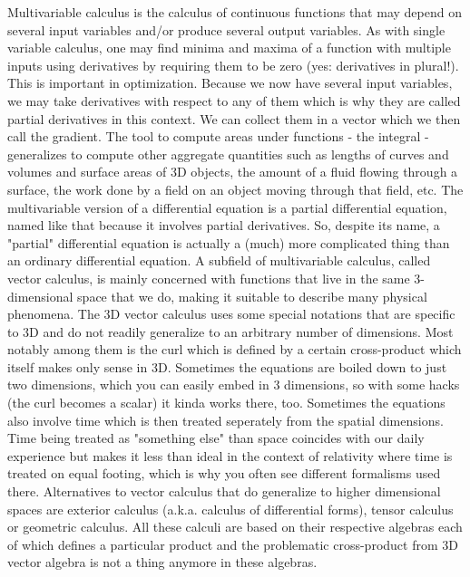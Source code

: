 \documentclass[12pt]{article}  %
\begin{document}
Multivariable calculus is the calculus of continuous functions that may depend on several input variables and/or produce several output variables. As with single variable calculus, one may find minima and maxima of a function with multiple inputs using derivatives by requiring them to be zero (yes: derivatives in plural!). This is important in optimization. Because we now have several input variables, we may take derivatives with respect to any of them which is why they are called partial derivatives in this context. We can collect them in a vector which we then call the gradient. The tool to compute areas under functions - the integral - generalizes to compute other aggregate quantities such as lengths of curves and volumes and surface areas of 3D objects, the amount of a fluid flowing through a surface, the work done by a field on an object moving through that field, etc. The multivariable version of a differential equation is a partial differential equation, named like that because it involves partial derivatives. So, despite its name, a "partial" differential equation is actually a (much) more complicated thing than an ordinary differential equation. A subfield of multivariable calculus, called vector calculus, is mainly concerned with functions that live in the same 3-dimensional space that we do, making it suitable to describe many physical phenomena. The 3D vector calculus uses some special notations that are specific to 3D and do not readily generalize to an arbitrary number of dimensions. Most notably among them is the curl which is defined by a certain cross-product which itself makes only sense in 3D. Sometimes the equations are boiled down to just two dimensions, which you can easily embed in 3 dimensions, so with some hacks (the curl becomes a scalar) it kinda works there, too. Sometimes the equations also involve time which is then treated seperately from the spatial dimensions. Time being treated as "something else" than space coincides with our daily experience but makes it less than ideal in the context of relativity where time is treated on equal footing, which is why you often see different formalisms used there. Alternatives to vector calculus that do generalize to higher dimensional spaces are exterior calculus (a.k.a. calculus of differential forms), tensor calculus or geometric calculus. All these calculi are based on their respective algebras each of which defines a particular product and the problematic cross-product from 3D vector algebra is not a thing anymore in these algebras.

\end{document}
